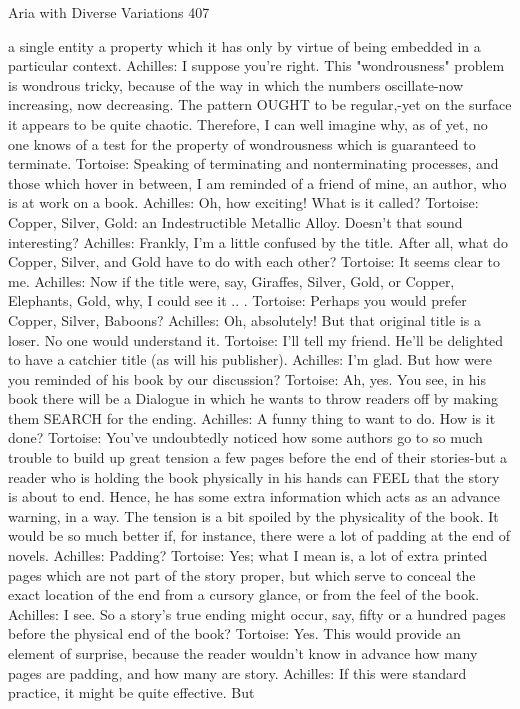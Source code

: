 Aria with Diverse Variations                                                             407

    a single entity a property which it has only by virtue of being embedded in a
    particular context.
Achilles: I suppose you're right. This "wondrousness" problem is wondrous tricky,
    because of the way in which the numbers oscillate-now increasing, now decreasing.
    The pattern OUGHT to be regular,-yet on the surface it appears to be quite chaotic.
    Therefore, I can well imagine why, as of yet, no one knows of a test for the property
    of wondrousness which is guaranteed to terminate.
Tortoise: Speaking of terminating and nonterminating processes, and those which hover
    in between, I am reminded of a friend of mine, an author, who is at work on a book.
Achilles: Oh, how exciting! What is it called?
Tortoise: Copper, Silver, Gold: an Indestructible Metallic Alloy. Doesn't that sound
    interesting?
Achilles: Frankly, I'm a little confused by the title. After all, what do Copper, Silver, and
    Gold have to do with each other? Tortoise: It seems clear to me.
Achilles: Now if the title were, say, Giraffes, Silver, Gold, or Copper, Elephants, Gold,
    why, I could see it .. .
Tortoise: Perhaps you would prefer Copper, Silver, Baboons?
Achilles: Oh, absolutely! But that original title is a loser. No one would understand it.
Tortoise: I'll tell my friend. He'll be delighted to have a catchier title (as will his
    publisher).
Achilles: I'm glad. But how were you reminded of his book by our discussion?
Tortoise: Ah, yes. You see, in his book there will be a Dialogue in which he wants to
    throw readers off by making them SEARCH for the ending.
Achilles: A funny thing to want to do. How is it done?
Tortoise: You've undoubtedly noticed how some authors go to so much trouble to build
    up great tension a few pages before the end of their stories-but a reader who is
    holding the book physically in his hands can FEEL that the story is about to end.
    Hence, he has some extra information which acts as an advance warning, in a way.
    The tension is a bit spoiled by the physicality of the book. It would be so much better
    if, for instance, there were a lot of padding at the end of novels.
Achilles: Padding?
Tortoise: Yes; what I mean is, a lot of extra printed pages which are not part of the story
    proper, but which serve to conceal the exact location of the end from a cursory
    glance, or from the feel of the book.
Achilles: I see. So a story's true ending might occur, say, fifty or a hundred pages before
    the physical end of the book?
Tortoise: Yes. This would provide an element of surprise, because the reader wouldn't
    know in advance how many pages are padding, and how many are story.
Achilles: If this were standard practice, it might be quite effective. But




